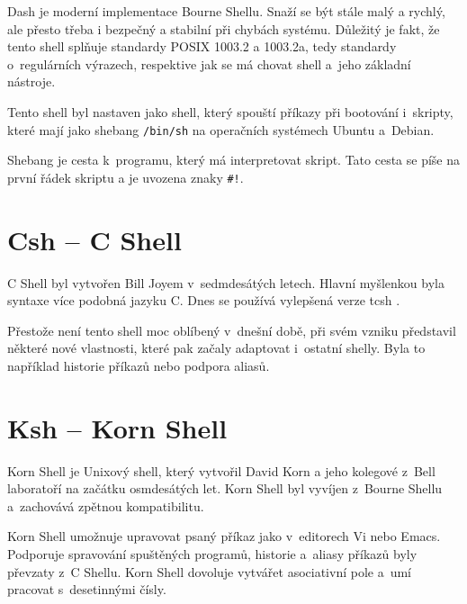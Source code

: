 \documentclass[thesis=M,czech]{FITthesis}[2012/06/26]
\begin{document}
Dash je moderní implementace Bourne Shellu. Snaží se být stále malý a rychlý, ale přesto třeba i bezpečný a stabilní při chybách systému. Důležitý je fakt, že tento shell splňuje standardy POSIX 1003.2 a 1003.2a, tedy standardy o~regulárních výrazech, respektive jak se má chovat shell a~jeho základní nástroje.

Tento shell byl nastaven jako shell, který spouští příkazy při bootování i~skripty, které mají jako shebang \texttt{/bin/sh} na operačních systémech Ubuntu a~Debian.

Shebang je cesta k~programu, který má interpretovat skript. Tato cesta se píše na první řádek skriptu a je uvozena znaky \texttt{\#!}.




%
%
%
\section{Csh -- C Shell}

C Shell byl vytvořen Bill Joyem v~sedmdesátých letech. Hlavní myšlenkou byla syntaxe více podobná jazyku C. Dnes se používá vylepšená verze tcsh \cite{tcsh}.

Přestože není tento shell moc oblíbený v~dnešní době, při svém vzniku představil některé nové vlastnosti, které pak začaly adaptovat i~ostatní shelly. Byla to například historie příkazů nebo podpora aliasů.




%
%
%
\section{Ksh -- Korn Shell}

Korn Shell \cite{ksh} je Unixový shell, který vytvořil David Korn a jeho kolegové z~Bell laboratoří na začátku osmdesátých let. Korn Shell byl vyvíjen z~Bourne Shellu a~zachovává zpětnou kompatibilitu.

Korn Shell umožnuje upravovat psaný příkaz jako v~editorech Vi nebo Emacs. Podporuje spravování spuštěných programů, historie a~aliasy příkazů byly převzaty z~C Shellu. Korn Shell dovoluje vytvářet asociativní pole a~umí pracovat s~desetinnými čísly.
\end{document}
